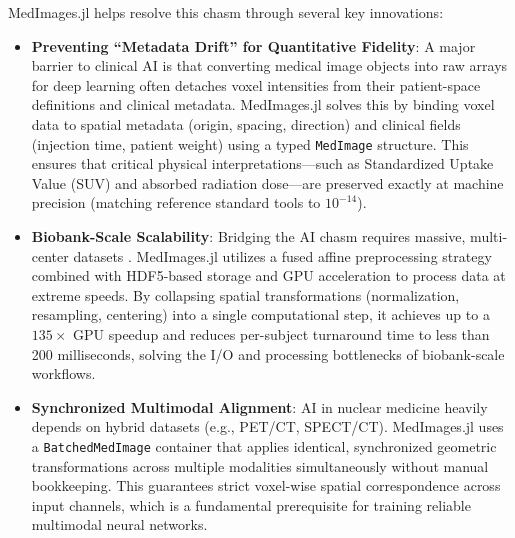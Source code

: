 \documentclass[a4paper,10pt]{elsarticle}
\begin{document}
MedImages.jl helps resolve this chasm through several key innovations:
\begin{itemize}
    \item \textbf{Preventing ``Metadata Drift'' for Quantitative Fidelity}: A major barrier to clinical AI is that converting medical image objects into raw arrays for deep learning often detaches voxel intensities from their patient-space definitions and clinical metadata. MedImages.jl solves this by binding voxel data to spatial metadata (origin, spacing, direction) and clinical fields (injection time, patient weight) using a typed \texttt{MedImage} structure. This ensures that critical physical interpretations—such as Standardized Uptake Value (SUV) and absorbed radiation dose—are preserved exactly at machine precision (matching reference standard tools to $10^{-14}$).
    \item \textbf{Biobank-Scale Scalability}: Bridging the AI chasm requires massive, multi-center datasets  \cite{MillerKuronuma2022}. MedImages.jl utilizes a fused affine preprocessing strategy combined with HDF5-based storage and GPU acceleration to process data at extreme speeds. By collapsing spatial transformations (normalization, resampling, centering) into a single computational step, it achieves up to a $135\times$ GPU speedup and reduces per-subject turnaround time to less than 200 milliseconds, solving the I/O and processing bottlenecks of biobank-scale workflows.
    \item \textbf{Synchronized Multimodal Alignment}: AI in nuclear medicine heavily depends on hybrid datasets (e.g., PET/CT, SPECT/CT). MedImages.jl uses a \texttt{BatchedMedImage} container that applies identical, synchronized geometric transformations across multiple modalities simultaneously without manual bookkeeping. This guarantees strict voxel-wise spatial correspondence across input channels, which is a fundamental prerequisite for training reliable multimodal neural networks.
\end{itemize}
\end{document}
